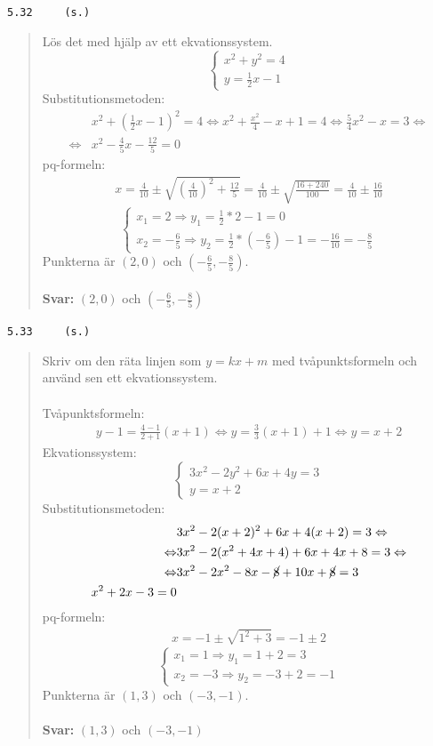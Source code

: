 \documentclass[a4paper]{article}
\newcommand{\tskcol}[1]{\textcolor{tskcol}{#1}}
\begin{document}
	\pagebreak
	\texttt{\tskcol{5.32~~~~ (s.)}}
	\begin{quotation}
		\noindent
		Lös det med hjälp av ett ekvationssystem.
		\[\begin{cases}
		x^2+y^2=4 \\
		y=\frac{1}{2}x-1
		\end{cases}\]
		Substitutionsmetoden:
		\begin{align*}
		&x^2+(\tfrac{1}{2}x-1)^2=4 \Leftrightarrow
		x^2+\frac{x^2}{4}-x+1=4 \Leftrightarrow
		\frac{5}{4}x^2-x=3 \Leftrightarrow \\ \Leftrightarrow
		&x^2-\frac{4}{5}x-\frac{12}{5}=0
		\end{align*}
		pq-formeln:
		\begin{align*}
		x=\frac{4}{10}\pm\sqrt{\left(\frac{4}{10}\right)^2+\frac{12}{5}}=
		\frac{4}{10}\pm\sqrt{\frac{16+240}{100}}=
		\frac{4}{10}\pm\frac{16}{10}
		\end{align*}
		\[\begin{cases}
		x_1=2 \Rightarrow y_1=\frac{1}{2}*2-1=0 \\
		x_2=-\frac{6}{5} \Rightarrow y_2=\frac{1}{2}*(-\frac{6}{5})-1=-\frac{16}{10}=-\frac{8}{5}
		\end{cases}\]
		Punkterna är $(2,0)$ och $(-\frac{6}{5},-\frac{8}{5})$.
		\\ \\
		\textbf{Svar:} $(2,0)$ och $(-\frac{6}{5},-\frac{8}{5})$
	\end{quotation}
	
	\texttt{\tskcol{5.33~~~~ (s.)}}
	\begin{quotation}
		\noindent
		Skriv om den räta linjen som $y=kx+m$ med tvåpunktsformeln och använd sen ett ekvationssystem.
		\\ \\
		Tvåpunktsformeln:
		\begin{align*}
		y-1=\frac{4-1}{2+1}(x+1) \Leftrightarrow
		y=\frac{3}{3}(x+1)+1 \Leftrightarrow
		y=x+2
		\end{align*}
		Ekvationssystem:
		\[\begin{cases}
		3x^2-2y^2+6x+4y=3 \\
		y=x+2
		\end{cases}\]
		Substitutionsmetoden:
		\begin{align*}
		&3x^2-2(x+2)^2+6x+4(x+2)=3 \Leftrightarrow \\ \Leftrightarrow
		&3x^2-2(x^2+4x+4)+6x+4x+8=3 \Leftrightarrow \\ \Leftrightarrow
		&3x^2-2x^2-8x-\cancel{8}+10x+\cancel{8}=3 \\
		x^2+2x-3=0
		\end{align*}
		pq-formeln:
		\begin{align*}
		x=-1\pm\sqrt{1^2+3}=
		-1\pm2
		\end{align*}
		\[\begin{cases}
		x_1=1 \Rightarrow y_1=1+2=3 \\
		x_2=-3 \Rightarrow y_2=-3+2=-1
		\end{cases}\]
		Punkterna är $(1,3)$ och $(-3,-1)$.
		\\ \\
		\textbf{Svar:} $(1,3)$ och $(-3,-1)$
	\end{quotation}
	
\end{document}
